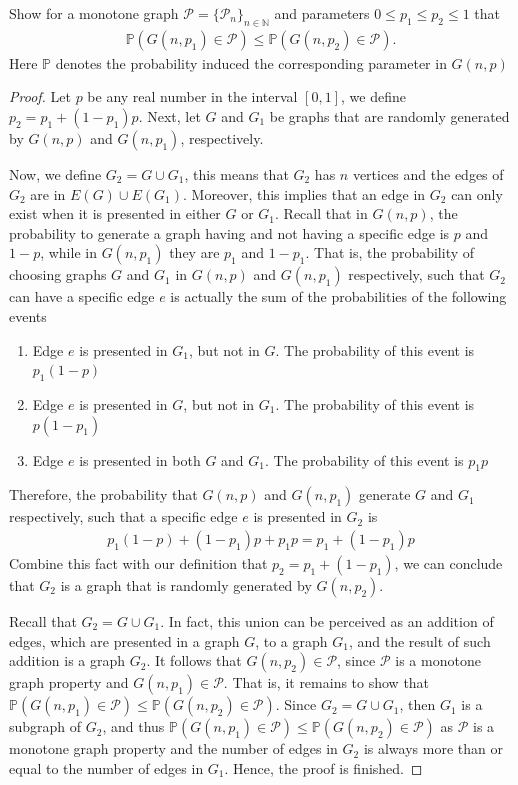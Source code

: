 \begin{problem}
  Show for a monotone graph $\mathcal{P} = \{\mathcal{P}_{n}\}_{n \in \mathbb{N}}$ and parameters $0 \leq p_{1} \leq p_{2} \leq 1$ that
  \begin{align*}
    \mathbb{P}(G(n,p_{1}) \in \mathcal{P}) \leq \mathbb{P}(G(n,p_{2}) \in \mathcal{P}).
  \end{align*}
  Here $\mathbb{P}$ denotes the probability induced the corresponding parameter in $G(n,p)$
\end{problem}
\begin{proof}
  Let $p$ be any real number in the interval $[0,1]$, we define $p_{2} = p_{1} + (1-p_{1})p$. Next, let $G$ and $G_{1}$ be graphs that are randomly generated by $G(n,p)$ and $G(n,p_{1})$, respectively. 

  Now, we define $G_{2} = G \cup G_{1}$, this means that $G_{2}$ has $n$ vertices and the edges of $G_{2}$ are in $E(G) \cup E(G_{1})$. Moreover, this implies that an edge in $G_{2}$ can only exist when it is presented in either $G$ or $G_{1}$. Recall that in $G(n,p)$, the probability to generate a graph having and not having a specific edge is $p$ and $1-p$, while in $G(n,p_{1})$ they are $p_{1}$ and $1-p_{1}$. That is, the probability of choosing graphs $G$ and $G_{1}$ in $G(n,p)$ and $G(n,p_{1})$ respectively, such that $G_{2}$ can have a specific edge $e$ is actually the sum of the probabilities of the following events
  \begin{enumerate}
    \item Edge $e$ is presented in $G_{1}$, but not in $G$. The probability of this event is $p_{1}(1-p)$
    \item Edge $e$ is presented in $G$, but not in $G_{1}$. The probability of this event is $p(1-p_{1})$
    \item Edge $e$ is presented in both $G$ and $G_{1}$. The probability of this event is $p_{1}p$
  \end{enumerate}
  Therefore, the probability that $G(n,p)$ and $G(n,p_{1})$ generate $G$ and $G_{1}$ respectively, such that a specific edge $e$ is presented in $G_{2}$ is 
  \begin{align*}
    p_{1}(1-p) + (1-p_{1})p  + p_{1}p = p_{1} + (1-p_{1})p
  \end{align*}
  Combine this fact with our definition that $p_{2} = p_{1} + (1-p_{1})$, we can conclude that $G_{2}$ is a graph that is randomly generated by $G(n,p_{2})$.

  Recall that $G_{2} = G \cup G_{1}$. In fact, this union can be perceived as an addition of edges, which are presented in a graph $G$, to a graph $G_{1}$, and the result of such addition is a graph $G_{2}$. It follows that $G(n,p_{2}) \in \mathcal{P}$, since $\mathcal{P}$ is a monotone graph property and $G(n,p_{1}) \in \mathcal{P}$. That is, it remains to show that $\mathbb{P}(G(n,p_{1}) \in \mathcal{P}) \leq \mathbb{P}(G(n,p_{2}) \in \mathcal{P})$. Since $G_{2} = G \cup G_{1}$, then $G_{1}$ is a subgraph of $G_{2}$, and thus $\mathbb{P}(G(n,p_{1}) \in \mathcal{P}) \leq \mathbb{P}(G(n,p_{2}) \in \mathcal{P})$ as $\mathcal{P}$ is a monotone graph property and the number of edges in $G_{2}$ is always more than or equal to the number of edges in $G_{1}$. Hence, the proof is finished.
\end{proof}
